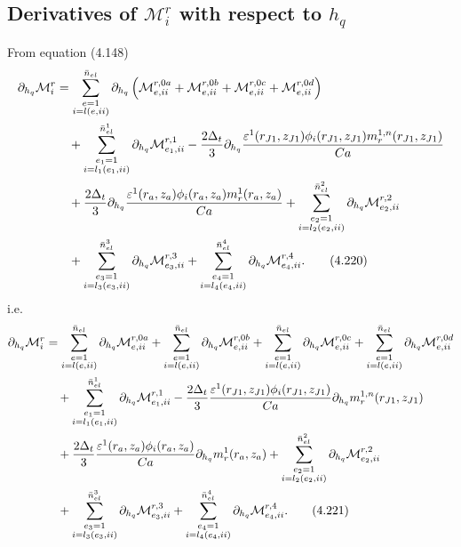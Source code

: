 \documentclass{article}
\begin{document}
\subsection{Derivatives of $\mathcal{M}_i^r$ with respect to $h_q$} %
From equation (4.148)
\begin{align}
\partial_{h_q}\mathcal{M}_i^r &= \sum_{\substack{e=1\\ i=l(e,ii)}}^{\bar{n}_{el}} \partial_{h_q} \left( \mathcal{M}_{e,ii}^{r,0a} + \mathcal{M}_{e,ii}^{r,0b} + \mathcal{M}_{e,ii}^{r,0c} + \mathcal{M}_{e,ii}^{r,0d} \right) \nonumber\\
&\quad + \sum_{\substack{e_1=1\\ i=l_1(e_1,ii)}}^{\bar{n}_{el}^1} \partial_{h_q} \mathcal{M}_{e_1,ii}^{r,1} 
- \frac{2\Delta_t}{3} \partial_{h_q} \frac{\varepsilon^1(r_{J1},z_{J1}) \phi_i(r_{J1},z_{J1}) m_r^{1,n}(r_{J1},z_{J1})}{Ca} \nonumber\\
&\quad + \frac{2\Delta_t}{3} \partial_{h_q} \frac{\varepsilon^1(r_a,z_a) \phi_i(r_a,z_a) m_r^{1}(r_a,z_a)}{Ca} 
+ \sum_{\substack{e_2=1\\ i=l_2(e_2,ii)}}^{\bar{n}_{el}^2} \partial_{h_q} \mathcal{M}_{e_2,ii}^{r,2} \nonumber\\
&\quad + \sum_{\substack{e_3=1\\ i=l_3(e_3,ii)}}^{\bar{n}_{el}^3} \partial_{h_q} \mathcal{M}_{e_3,ii}^{r,3} 
+ \sum_{\substack{e_4=1\\ i=l_4(e_4,ii)}}^{\bar{n}_{el}^4} \partial_{h_q} \mathcal{M}_{e_4,ii}^{r,4}. \tag{4.220}
\end{align}
i.e.
\begin{align}
\partial_{h_q}\mathcal{M}_i^r &= \sum_{\substack{e=1\\ i=l(e,ii)}}^{\bar{n}_{el}} \partial_{h_q} \mathcal{M}_{e,ii}^{r,0a} 
+ \sum_{\substack{e=1\\ i=l(e,ii)}}^{\bar{n}_{el}} \partial_{h_q} \mathcal{M}_{e,ii}^{r,0b} 
+ \sum_{\substack{e=1\\ i=l(e,ii)}}^{\bar{n}_{el}} \partial_{h_q} \mathcal{M}_{e,ii}^{r,0c} 
+ \sum_{\substack{e=1\\ i=l(e,ii)}}^{\bar{n}_{el}} \partial_{h_q} \mathcal{M}_{e,ii}^{r,0d} \nonumber\\
&\quad + \sum_{\substack{e_1=1\\ i=l_1(e_1,ii)}}^{\bar{n}_{el}^1} \partial_{h_q} \mathcal{M}_{e_1,ii}^{r,1} 
- \frac{2\Delta_t}{3} \frac{\varepsilon^1(r_{J1},z_{J1}) \phi_i(r_{J1},z_{J1})}{Ca} \partial_{h_q} m_r^{1,n}(r_{J1},z_{J1}) \nonumber\\
&\quad + \frac{2\Delta_t}{3} \frac{\varepsilon^1(r_a,z_a) \phi_i(r_a,z_a)}{Ca} \partial_{h_q} m_r^{1}(r_a,z_a) 
+ \sum_{\substack{e_2=1\\ i=l_2(e_2,ii)}}^{\bar{n}_{el}^2} \partial_{h_q} \mathcal{M}_{e_2,ii}^{r,2} \nonumber\\
&\quad + \sum_{\substack{e_3=1\\ i=l_3(e_3,ii)}}^{\bar{n}_{el}^3} \partial_{h_q} \mathcal{M}_{e_3,ii}^{r,3} 
+ \sum_{\substack{e_4=1\\ i=l_4(e_4,ii)}}^{\bar{n}_{el}^4} \partial_{h_q} \mathcal{M}_{e_4,ii}^{r,4}. \tag{4.221}
\end{align}
\end{document}
